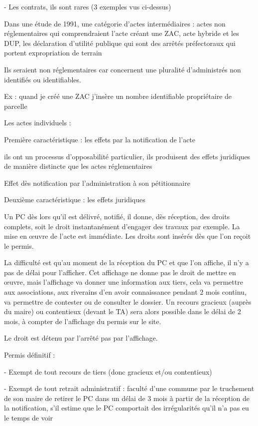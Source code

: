		-	Les contrats, ils sont rares (3 exemples vus ci-dessus)

		Dans une étude de 1991, une catégorie d’actes intermédiaires : actes non réglementaires qui comprendraient l’acte créant une ZAC, acte hybride et les DUP, les déclaration d’utilité publique qui sont des arrêtés préfectoraux qui portent expropriation de terrain

		Ils seraient non réglementaires car concernent une pluralité d’administrés non identifiés ou identifiables.

		Ex : quand je créé une ZAC j’insère un nombre identifiable propriétaire de parcelle


		Les actes individuels :

		Première caractéristique : les effets par la notification de l’acte

		ils ont un processus d’opposabilité particulier, ils produisent des effets juridiques de manière distincte que les actes réglementaires

		Effet dès notification par l’administration à son pétitionnaire

		Deuxième caractéristique : les effets juridiques

		Un PC dès lors qu’il est délivré, notifié, il donne, dès réception, des droits complets, soit le droit instantanément d’engager des travaux par exemple. La mise en œuvre de l’acte est immédiate. Les droits sont insérés dès que l’on reçoit le permis.

		La difficulté est qu’au moment de la réception du PC et que l’on affiche, il n’y a pas de délai pour l’afficher. Cet affichage ne donne pas le droit de mettre en œuvre, mais l’affichage va donner une information aux tiers, cela va permettre aux associations, aux riverains d’en avoir connaissance pendant 2 mois continu, va permettre de contester ou de consulter le dossier. Un recours gracieux (auprès du maire) ou contentieux (devant le TA) sera alors possible dans le délai de 2 mois, à compter de l’affichage du permis sur le site.

		Le droit est détenu par l’arrêté pas par l’affichage.

		Permis définitif :

		-	Exempt de tout recours de tiers (donc gracieux et/ou contentieux)

		-	Exempt de tout retrait administratif : faculté d’une commune par le truchement de son maire de retirer le PC dans un délai de 3 mois à partir de la réception de la notification, s’il estime que le PC comportait des irrégularités qu’il n’a pas eu le temps de voir

